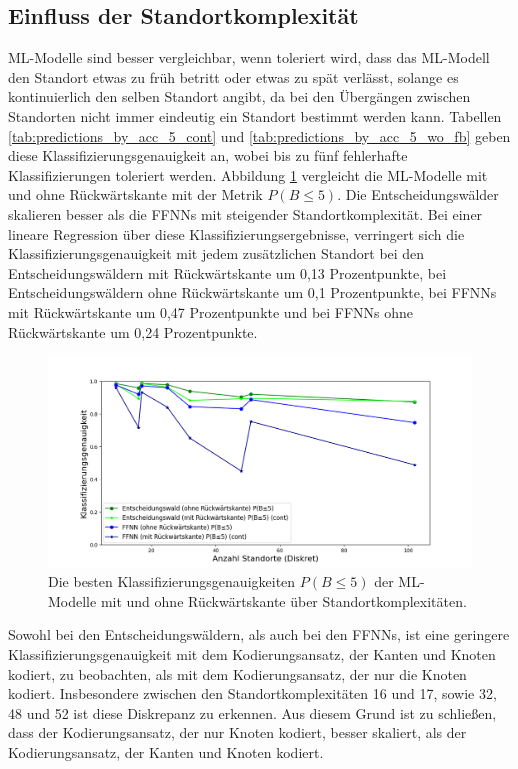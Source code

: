 \subsection{Einfluss der Standortkomplexität}
ML-Modelle sind besser vergleichbar, wenn toleriert wird, dass das ML-Modell den Standort etwas zu früh betritt oder etwas zu spät verlässt,
solange es kontinuierlich den selben Standort angibt, da bei den Übergängen zwischen Standorten nicht immer eindeutig ein Standort bestimmt werden kann.
Tabellen \ref{tab:predictions_by_acc_5_cont} und \ref{tab:predictions_by_acc_5_wo_fb} geben diese Klassifizierungsgenauigkeit an,
wobei bis zu fünf fehlerhafte Klassifizierungen toleriert werden.
\newline
\newline
Abbildung \ref{fig:best_dt_vs_knn_pb_5_vs_pb_5_cont} vergleicht die ML-Modelle mit und ohne Rückwärtskante mit der Metrik $P(B\leq5)$.
Die Entscheidungswälder skalieren besser als die FFNNs mit steigender Standortkomplexität.
Bei einer lineare Regression über diese Klassifizierungsergebnisse,
verringert sich die Klassifizierungsgenauigkeit mit jedem zusätzlichen Standort bei den Entscheidungswäldern mit Rückwärtskante um 0,13 Prozentpunkte,
bei Entscheidungswäldern ohne Rückwärtskante um 0,1 Prozentpunkte,
bei FFNNs mit Rückwärtskante um 0,47 Prozentpunkte und bei FFNNs ohne Rückwärtskante um 0,24 Prozentpunkte.
\begin{figure}[h!]
    \centering
    \includegraphics[width=\linewidth]{images/best_dt_vs_knn_pb_5_vs_pb_5_cont.png}
    \caption{Die besten Klassifizierungsgenauigkeiten $P(B\leq5)$ der ML-Modelle mit und ohne Rückwärtskante über Standortkomplexitäten.}
    \label{fig:best_dt_vs_knn_pb_5_vs_pb_5_cont}
\end{figure}
\newline
\newline
Sowohl bei den Entscheidungswäldern, als auch bei den FFNNs, ist eine geringere Klassifizierungsgenauigkeit mit dem Kodierungsansatz, der Kanten und Knoten kodiert,
zu beobachten, als mit dem Kodierungsansatz, der nur die Knoten kodiert.
Insbesondere zwischen den Standortkomplexitäten 16 und 17, sowie 32, 48 und 52 ist diese Diskrepanz zu erkennen.
Aus diesem Grund ist zu schließen, dass der Kodierungsansatz, der nur Knoten kodiert, besser skaliert, als der Kodierungsansatz, der Kanten und Knoten kodiert.

